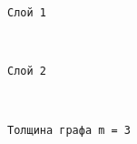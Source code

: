 \documentclass[11pt]{article}
\begin{document}
    \begin{Verbatim}[commandchars=\\\{\}]
Слой 1
    \end{Verbatim}

    \begin{center}
    \end{center}
    { \hspace*{\fill} \\}
    
    \begin{Verbatim}[commandchars=\\\{\}]
Слой 2
    \end{Verbatim}

    \begin{center}
    \end{center}
    { \hspace*{\fill} \\}
    
    \begin{Verbatim}[commandchars=\\\{\}]
Толщина графа m = 3
    \end{Verbatim}


    
    
    
\end{document}
